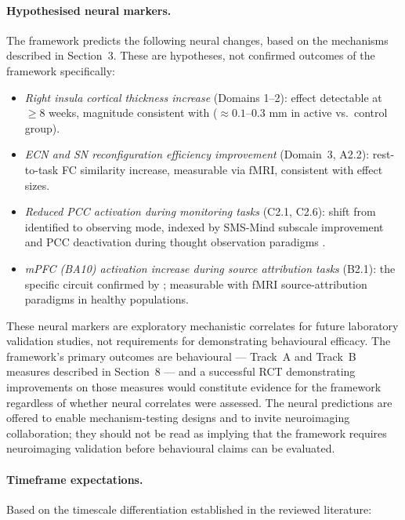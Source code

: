 \documentclass[12pt, a4paper]{article}
\begin{document}
\paragraph{Hypothesised neural markers.}
The framework predicts the following neural changes, based on the mechanisms
described in Section~3. These are hypotheses, not confirmed outcomes of the
framework specifically:

\begin{itemize}[leftmargin=2em]
\item \emph{Right insula cortical thickness increase} (Domains 1--2): effect
detectable at $\geq 8$ weeks, magnitude consistent with \citet{calderone2024}
($\approx 0.1$--$0.3$ mm in active vs.\ control group).
\item \emph{ECN and SN reconfiguration efficiency improvement} (Domain~3, A2.2):
rest-to-task FC similarity increase, measurable via fMRI, consistent with
\citet{yue2023} effect sizes.
\item \emph{Reduced PCC activation during monitoring tasks} (C2.1, C2.6): shift
from identified to observing mode, indexed by SMS-Mind subscale improvement and
PCC deactivation during thought observation paradigms \citep{ganesan2025}.
\item \emph{mPFC (BA10) activation increase during source attribution tasks} (B2.1):
the specific circuit confirmed by \citet{simons2008, subramaniam2012}; measurable
with fMRI source-attribution paradigms in healthy populations.
\end{itemize}

These neural markers are exploratory mechanistic correlates for future laboratory
validation studies, not requirements for demonstrating behavioural efficacy. The
framework's primary outcomes are behavioural --- Track~A and Track~B measures
described in Section~8 --- and a successful RCT demonstrating improvements on
those measures would constitute evidence for the framework regardless of whether
neural correlates were assessed. The neural predictions are offered to enable
mechanism-testing designs and to invite neuroimaging collaboration; they should
not be read as implying that the framework requires neuroimaging validation
before behavioural claims can be evaluated.

\paragraph{Timeframe expectations.}
Based on the timescale differentiation established in the reviewed literature:
\end{document}
